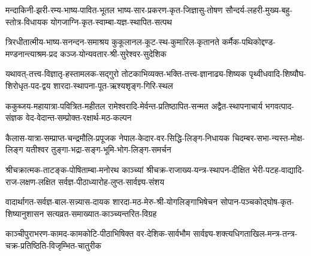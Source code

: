 \twolineshloka
{मन्दाकिनी-झरी-रम्य-भाष्य-पावित-भूतल}
{भाष्य-सार-प्रकरण-कृत-जिज्ञासु-तोषण}
\twolineshloka
{सौन्दर्य-लहरी-मुख्य-बहु-स्तोत्र-विधायक}
{योगजाग्नि-कृत-स्वाम्बा-यज्ञ-स्थापित-सत्पथ}
\jayavijayibhava

\twolineshloka
{त्रिरधीतात्मीय-भाष्य-सनन्दन-समाश्रय}
{कुकूलानल-कूट-स्थ-कुमारिल-कृतानते}
\twolineshloka
{कर्मैक-पथिकोद्दण्ड-मण्डनान्त्याश्रम-प्रद}
{कञ्ज-योन्यवतार-श्री-सुरेश्वर-सुदेशिक}
\jayavijayibhava

\twolineshloka
{यथावत्-तत्त्व-विज्ञातृ-हस्तामलक-सद्गुरो}
{तोटकाभिव्यक्त-भक्ति-तत्त्व-ज्ञानाढ्य-शिष्यक}
\twolineshloka
{पृथ्वीधवादि-शिष्यौघ-शिरोधृत-पद-द्वय}
{शारदा-स्थापना-पूत-ऋश्यशृङ्ग-गिरि-स्थल}
\jayavijayibhava

\twolineshloka
{ककुब्जय-महायात्रा-पवित्रित-महीतल}
{रामेश्वरादि-मेर्वन्त-प्रतिष्ठापित-सन्मत}
\twolineshloka
{अद्वैत-स्थापनाचार्य भगवत्पाद-संज्ञक}
{वेद-वेदान्त-सम्प्रोक्त-रक्षार्थ-मठ-कल्पन}
\jayavijayibhava

\twolineshloka
{कैलास-यात्रा-सम्प्राप्त-चन्द्रमौलि-प्रपूजक}
{नेपाल-केदार-वर-सिद्धि-लिङ्ग-निधायक}
\twolineshloka
{चिदम्बर-सभा-न्यस्त-मोक्ष-लिङ्ग यतीश्वर}
{तुङ्गा-भद्रा-सङ्ग-भूमि-भोग-लिङ्ग-समर्चन}
\jayavijayibhava

\twolineshloka
{श्रीचक्रात्मक-ताटङ्क-पोषिताम्बा-मनोरथ}
{काञ्च्यां श्रीचक्र-राजाख्य-यन्त्र-स्थापन-दीक्षित}
\twolineshloka
{भेरी-पटह-वाद्यादि-राज-लक्षण-लक्षित}
{सर्वज्ञ-पीठाध्यारोह-लुप्त-सार्वज्ञ्य-संशय}
\jayavijayibhava

\twolineshloka
{वादार्थागत-सर्वज्ञ-बाल-सन्न्यास-दायक}
{शारदा-मठ-मेरु-श्री-योगलिङ्गाभिषेचन}
\twolineshloka
{सोपान-पञ्चकोद्घोष-कृत-शिष्यानुशासन}
{सत्यव्रत-समाख्यात-काञ्च्यन्तरित-विग्रह}
\jayavijayibhava

\twolineshloka
{काञ्चीपुराभरण-कामद-कामकोटि-पीठाभिषिक्त वर-देशिक-सार्वभौम}
{सार्वज्ञ्य-शक्त्यधिगताखिल-मन्त्र-तन्त्र-चक्र-प्रतिष्ठिति-विजृम्भित-चातुरीक}
\jayavijayibhava


\closesection


\centering

\vfill
{}
